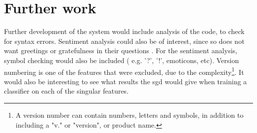 \section{Further work}
\label{sec:further_work}
Further development of the system would include analysis of the code, to check for syntax errors. 
Sentiment analysis could also be of interest, since \gls{so} does not want greetings or gratefulness in their questions \cite{CommunityWiki2016a}.
For the sentiment analysis, symbol checking would also be included ( e.g. '?', '!', emoticons, etc).
Version numbering is one of the features that were excluded, due to the complexity\footnote{
	A version number can contain numbers, letters and symbols, in addition to including a "v." or "version", or product name.
}.
It would also be interesting to see what results the \gls{sgd} would give when training a classifier on each of the singular features.


\begin{comment}

If these are'nt relevant, just remove them



\end{comment}

